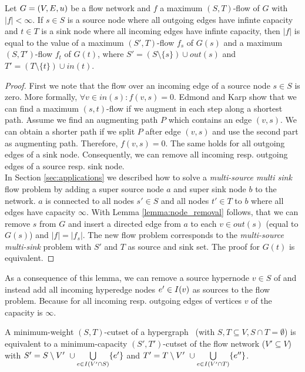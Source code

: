 \begin{lemma}
\label{lemma:source_and_sink_removal}
Let $G = (V,E,u)$ be a flow network and $f$ a maximum $(S,T)$-flow of $G$ with $|f| < \infty$.
If $s \in S$ is a source node where all outgoing edges have infinte capacity and
$t \in T$ is a sink node where all incoming edges have infinte capacity, then
$|f|$ is equal to the value of a maximum $(S',T)$-flow $f_s$ of $G(s)$ and a maximum
$(S,T')$-flow $f_t$ of $G(t)$, where $S' = (S\setminus \{s\}) \cup out(s)$ 
and $T' = (T \setminus \{t\}) \cup in(t)$.
\end{lemma}

\begin{proof}
First we note that the flow over an incoming edge of a source node $s \in S$ is zero.
More formally, $\forall v \in in(s): f(v,s) = 0$. Edmond and Karp \cite{edmonds1972theoretical} 
show that we can find a maximum $(s,t)$-flow if we augment in each step along a shortest path. 
Assume we find an augmenting path $P$ which contains an edge $(v,s)$. We
can obtain a shorter path if we split $P$ after edge $(v,s)$ and use the second part as
augmenting path. Therefore, $f(v,s) = 0$. The same holds for all outgoing edges of a sink
node. Consequently, we can remove all incoming resp. outgoing edges of a source resp. sink node. \\
In Section \ref{sec:applications} we described how to solve a \emph{multi-source 
multi sink} flow problem by adding a super source node $a$ and super sink node $b$ to the network.
$a$ is connected to all nodes $s' \in S$ and all nodes $t' \in T$ to $b$ 
where all edges have capacity $\infty$. With Lemma
\ref{lemma:node_removal} follows, that we can remove $s$ from $G$ and insert
a directed edge from $a$ to each $v \in out(s)$ (equal to $G(s)$) and $|f| = |f_s|$. The new flow problem
corresponds to the \emph{multi-source multi-sink} problem with $S'$ and $T$ as source
and sink set. The proof for $G(t)$ is equivalent.
\end{proof}

As a consequence of this lemma, we can remove 
a source hypernode $v \in S$ of  and instead add all
incoming hyperedge nodes $e' \in I(v)$ as sources to the flow 
problem. Because for all incoming resp. outgoing edges of vertices $v$ of 
 the capacity is $\infty$.

\begin{theorem}
\label{theorem:st_cutset_equal}
A minimum-weight $(S,T)$-cutset of a hypergraph \HypergraphDef~(with $S,T \subseteq V,
S \cap T = \emptyset$) is equivalent to a minimum-capacity $(S',T')$-cutset of the
flow network  ($V' \subseteq V$) with $S' = S \setminus V'\ \cup \bigcup\limits_{e \in I(V' \cap S)} \{e'\}$ and 
$T' = T \setminus V'\ \cup \bigcup\limits_{e \in I(V'\cap T)} \{e''\}$.
\label{theorem:heuer_network}
\end{theorem}

